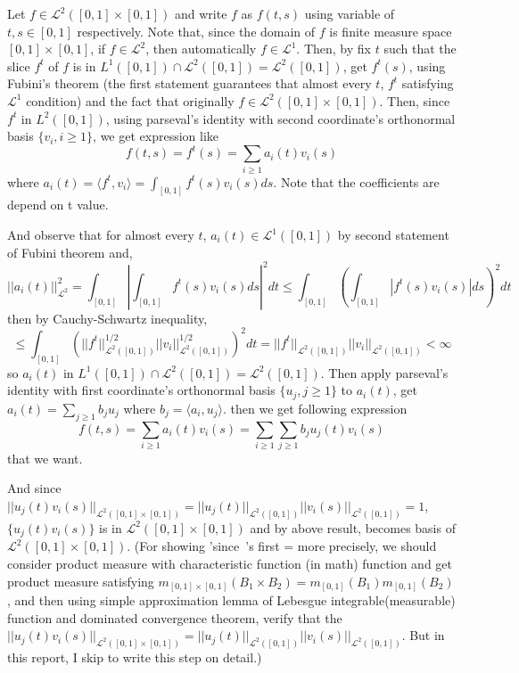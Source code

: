 \documentclass{article}
\begin{document}
Let $f\in \mathcal{L}^2([0,1]\times[0,1])$ and write $f$ as $f(t,s)$ using variable of $t,s\in[0,1]$ respectively.
Note that, since the domain of $f$ is finite measure space $[0,1]\times[0,1]$, if $f\in\mathcal{L}^2$, then automatically $f\in\mathcal{L}^1$.
Then, by fix $t$ such that the slice $f^t$ of $f$ is in $L^1([0,1]) \cap \mathcal{L}^2([0,1])=\mathcal{L}^2([0,1])$, get $f^t(s)$,
using Fubini's theorem (the first statement guarantees that almost every $t$, $f^t$ satisfying $\mathcal{L}^1$ condition) and
the fact that originally $f\in \mathcal{L}^2([0,1]\times[0,1])$.
Then, since $f^t$ in $L^2([0,1])$, using parseval's identity with second coordinate's orthonormal basis $\{v_i, i\geq 1\}$,
we get expression like 
\[f(t,s)=f^t(s)=\sum_{i\geq 1}a_i(t)v_i(s)\]
where \(a_i(t)=\langle f^t, v_i \rangle=\int_{[0,1]}f^t(s)v_i(s)ds\).
Note that the coefficients are depend on t value.

And observe that for almost every $t$, $a_i(t)\in\mathcal{L}^1([0,1])$ by second statement of Fubini theorem and,
\[||a_i(t)||^2_{\mathcal{L}^2}=\int_{[0,1]}|\int_{[0,1]}f^t(s)v_i(s)ds|^2dt
\leq \int_{[0,1]}(\int_{[0,1]}|f^t(s)v_i(s)|ds)^2dt\]
then by Cauchy-Schwartz inequality,
\[\leq \int_{[0,1]}(||f^t||_{\mathcal{L}^2([0,1])}^{1/2}||v_i||_{\mathcal{L}^2([0,1])}^{1/2})^2dt
=||f^t||_{\mathcal{L}^2([0,1])}||v_i||_{\mathcal{L}^2([0,1])}
< \infty\]
so $a_i(t)$ in $L^1([0,1]) \cap \mathcal{L}^2([0,1])=\mathcal{L}^2([0,1])$.
Then apply parseval's identity with first coordinate's orthonormal basis $\{u_j, j\geq 1\}$ to $a_i(t)$,
get $a_i(t)=\sum_{j \geq 1} b_ju_j$ where $b_j=\langle a_i, u_j\rangle$.
then we get following expression
\[f(t,s)=\sum_{i\geq 1}a_i(t)v_i(s)=\sum_{i\geq 1}\sum_{j \geq 1} b_ju_j(t)v_i(s)\]
that we want.

And since $||u_j(t)v_i(s)||_{\mathcal{L}^2([0,1]\times[0,1])}=||u_j(t)||_{\mathcal{L}^2([0,1])}||v_i(s)||_{\mathcal{L}^2([0,1])}=1$,
$\{u_j(t)v_i(s)\}$ is in $\mathcal{L}^2([0,1]\times[0,1])$ and by above result, becomes basis of $\mathcal{L}^2([0,1]\times[0,1])$.
(For showing 'since~'s first = more precisely, we should consider product measure with characteristic function (in math) function and 
get product measure satisfying $m_{[0,1]\times[0,1]}(B_1\times B_2)=m_{[0,1]}(B_1)m_{[0,1]}(B_2)$, 
and then using simple approximation lemma of Lebesgue integrable(measurable) function and dominated convergence theorem,
verify that the $||u_j(t)v_i(s)||_{\mathcal{L}^2([0,1]\times[0,1])}=||u_j(t)||_{\mathcal{L}^2([0,1])}||v_i(s)||_{\mathcal{L}^2([0,1])}$.
But in this report, I skip to write this step on detail.)
\end{document}
